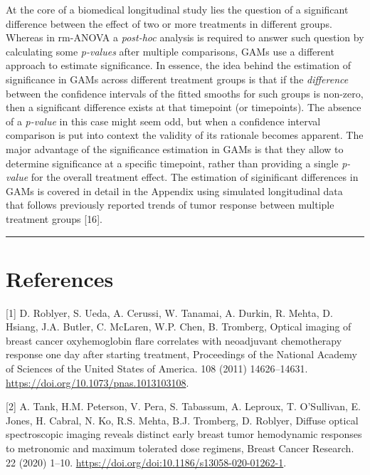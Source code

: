 \documentclass[
]{article}
\begin{document}
At the core of a biomedical longitudinal study lies the question of a significant difference between the effect of two or more treatments in different groups. Whereas in rm-ANOVA a \emph{post-hoc} analysis is required to answer such question by calculating some \emph{p-values} after multiple comparisons, GAMs use a different approach to estimate significance. In essence, the idea behind the estimation of significance in GAMs across different treatment groups is that if the \emph{difference} between the confidence intervals of the fitted smooths for such groups is non-zero, then a significant difference exists at that timepoint (or timepoints). The absence of a \emph{p-value} in this case might seem odd, but when a confidence interval comparison is put into context the validity of its rationale becomes apparent. The major advantage of the significance estimation in GAMs is that they allow to determine significance at a specific timepoint, rather than providing a single \emph{p-value} for the overall treatment effect. The estimation of siginificant differences in GAMs is covered in detail in the Appendix using simulated longitudinal data that follows previously reported trends of tumor response between multiple treatment groups {[}16{]}.

\begin{center}\rule{0.5\linewidth}{0.5pt}\end{center}

\hypertarget{references}{%
\section{References}\label{references}}

\hypertarget{refs}{}
\leavevmode\hypertarget{ref-roblyer2011}{}%
{[}1{]} D. Roblyer, S. Ueda, A. Cerussi, W. Tanamai, A. Durkin, R. Mehta, D. Hsiang, J.A. Butler, C. McLaren, W.P. Chen, B. Tromberg, Optical imaging of breast cancer oxyhemoglobin flare correlates with neoadjuvant chemotherapy response one day after starting treatment, Proceedings of the National Academy of Sciences of the United States of America. 108 (2011) 14626--14631. \url{https://doi.org/10.1073/pnas.1013103108}.

\leavevmode\hypertarget{ref-tank2020}{}%
{[}2{]} A. Tank, H.M. Peterson, V. Pera, S. Tabassum, A. Leproux, T. O'Sullivan, E. Jones, H. Cabral, N. Ko, R.S. Mehta, B.J. Tromberg, D. Roblyer, Diffuse optical spectroscopic imaging reveals distinct early breast tumor hemodynamic responses to metronomic and maximum tolerated dose regimens, Breast Cancer Research. 22 (2020) 1--10. \url{https://doi.org/doi:10.1186/s13058-020-01262-1}.
\end{document}
